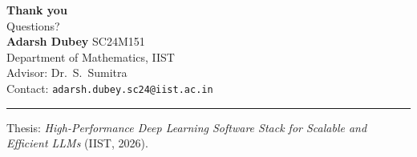 \documentclass[10pt,aspectratio=169]{beamer}
\begin{document}
\begin{frame}[plain]
  \vspace{2em}
  \centering
  {\Large \textbf{Thank you}}\\[1.5ex]
  {\large Questions?}\\[3ex]

  \footnotesize
  \textbf{Adarsh Dubey} \hfill SC24M151\\
  Department of Mathematics, IIST\\
  Advisor: Dr.~S.~Sumitra\\[2ex]

  \alert{Contact}: \texttt{adarsh.dubey.sc24@iist.ac.in}
  \vfill
  \hrule
  \vspace{0.5ex}
  \tiny
  Thesis: \emph{High-Performance Deep Learning Software Stack for
  Scalable and Efficient LLMs} (IIST, 2026).
\end{frame}
\end{document}
